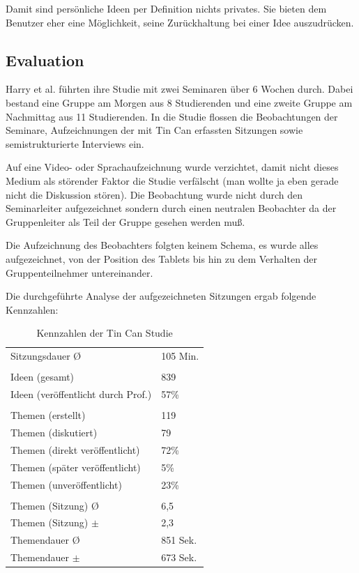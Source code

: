 Damit sind persönliche Ideen per Definition nichts privates. Sie bieten dem
Benutzer eher eine Möglichkeit, seine Zurückhaltung bei einer Idee auszudrücken.


\subsection{Evaluation}
Harry et al. \cite{HarGorSch2012} führten ihre Studie mit zwei Seminaren über 6 Wochen durch. Dabei
bestand eine Gruppe am Morgen aus 8 Studierenden und eine zweite Gruppe am
Nachmittag aus 11 Studierenden. In die Studie \cite{HarGorSch2012} flossen die Beobachtungen der
Seminare, Aufzeichnungen der mit Tin Can erfassten Sitzungen sowie
semistrukturierte Interviews ein.

Auf eine Video- oder Sprachaufzeichnung wurde verzichtet, damit nicht dieses
Medium als störender Faktor die Studie \cite{HarGorSch2012} verfälscht (man wollte ja eben gerade
nicht die Diskussion stören). Die Beobachtung wurde nicht durch den
Seminarleiter aufgezeichnet sondern durch einen neutralen Beobachter da der
Gruppenleiter als Teil der Gruppe gesehen werden muß.

Die Aufzeichnung des Beobachters folgten keinem Schema, es wurde alles
aufgezeichnet, von der Position des Tablets bis hin zu dem Verhalten der
Gruppenteilnehmer untereinander.

Die durchgeführte Analyse der aufgezeichneten Sitzungen ergab folgende Kennzahlen:

\begin{table}[htp]
  \begin{tabular}{ l  l }
    Sitzungsdauer \O & 105 Min.\\
    \\
    Ideen  (gesamt) &  839 \\
    Ideen  (veröffentlicht durch Prof.) & 57\% \\
    \\
    Themen (erstellt) & 119 \\
    Themen (diskutiert) & 79 \\
    Themen (direkt veröffentlicht) & 72\% \\
    Themen (später veröffentlicht) & 5\% \\ 
    Themen (unveröffentlicht) & 23\% \\
    \\
    Themen (Sitzung) \O & 6,5 \\
    Themen (Sitzung) $\pm$ & 2,3 \\
    Themendauer \O & 851 Sek. \\
    Themendauer $\pm$ & 673 Sek. \\
  \end{tabular}
  \caption{Kennzahlen der Tin Can Studie}
\end{table}

